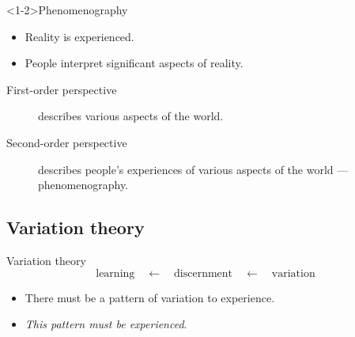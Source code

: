 \begin{frame}
  \begin{block}<1-2>{Phenomenography~\cite{Phenomenography}}
    \begin{itemize}
      \item Reality is experienced.
      \item People interpret significant aspects of reality.
    \end{itemize}
    \pause
    \begin{description}
      \item[First-order perspective] describes various aspects of the world.
      \item[Second-order perspective] describes people's experiences of various 
        aspects of the world --- phenomenography.
    \end{description}
  \end{block}
\end{frame}

\subsection{Variation theory}

\begin{frame}
  \begin{block}{Variation theory~\cite{VariationTheory}}
    \vspace{-0.5em}
    \[
      \text{learning}
      \quad\leftarrow\quad
      \text{discernment}
      \quad\leftarrow\quad
      \text{variation}
    \]
  \end{block}

  \pause

  \begin{remark}
    \begin{itemize}
      \item There must be a pattern of variation to experience.
      \item \emph{This pattern must be experienced}.
    \end{itemize}
  \end{remark}
\end{frame}

